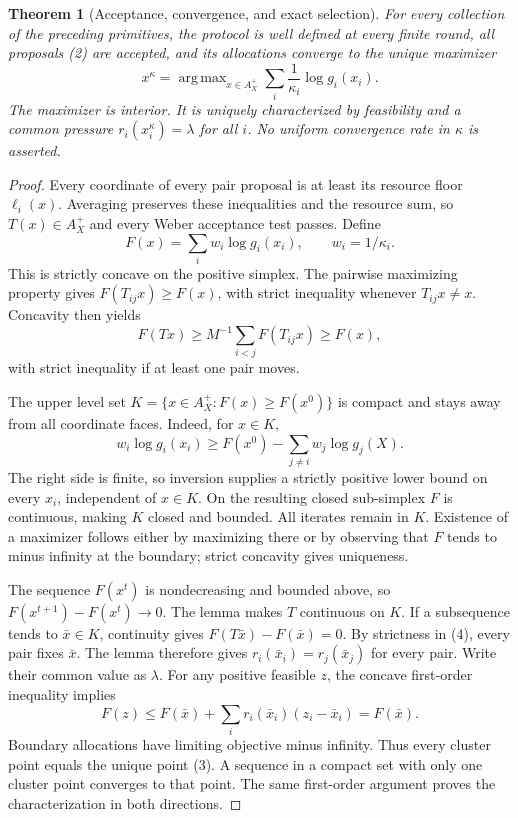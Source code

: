 \documentclass[11pt]{article}
\newtheorem{theorem}{Theorem}
\theoremstyle{remark}\newtheorem{remark}[theorem]{Remark}
\DeclareMathOperator*{\argmax}{arg\,max}
\begin{document}
\begin{theorem}[Acceptance, convergence, and exact selection]
For every collection of the preceding primitives, the protocol is well defined at every finite round, all proposals (2) are accepted, and its allocations converge to the unique maximizer
\[
 x^\kappa=\argmax_{x\in A_X^+}\sum_i\frac1{\kappa_i}\log g_i(x_i).
 \tag{3}
\]
The maximizer is interior. It is uniquely characterized by feasibility and a common pressure $r_i(x_i^\kappa)=\lambda$ for all $i$. No uniform convergence rate in $\kappa$ is asserted.
\end{theorem}
\begin{proof}
Every coordinate of every pair proposal is at least its resource floor $\ell_i(x)$. Averaging preserves these inequalities and the resource sum, so $T(x)\in A_X^+$ and every Weber acceptance test passes. Define
\[
 F(x)=\sum_i w_i\log g_i(x_i),\qquad w_i=1/\kappa_i.
\]
This is strictly concave on the positive simplex. The pairwise maximizing property gives $F(T_{ij}x)\ge F(x)$, with strict inequality whenever $T_{ij}x\ne x$. Concavity then yields
\[
 F(Tx)\ge M^{-1}\sum_{i<j}F(T_{ij}x)\ge F(x),
 \tag{4}
\]
with strict inequality if at least one pair moves.

The upper level set $K=\{x\in A_X^+:F(x)\ge F(x^0)\}$ is compact and stays away from all coordinate faces. Indeed, for $x\in K$,
\[
 w_i\log g_i(x_i)\ge F(x^0)-\sum_{j\ne i}w_j\log g_j(X).
\]
The right side is finite, so inversion supplies a strictly positive lower bound on every $x_i$, independent of $x\in K$. On the resulting closed sub-simplex $F$ is continuous, making $K$ closed and bounded. All iterates remain in $K$. Existence of a maximizer follows either by maximizing there or by observing that $F$ tends to minus infinity at the boundary; strict concavity gives uniqueness.

The sequence $F(x^t)$ is nondecreasing and bounded above, so $F(x^{t+1})-F(x^t)\to0$. The lemma makes $T$ continuous on $K$. If a subsequence tends to $\bar x\in K$, continuity gives $F(T\bar x)-F(\bar x)=0$. By strictness in (4), every pair fixes $\bar x$. The lemma therefore gives $r_i(\bar x_i)=r_j(\bar x_j)$ for every pair. Write their common value as $\lambda$. For any positive feasible $z$, the concave first-order inequality implies
\[
 F(z)\le F(\bar x)+\sum_i r_i(\bar x_i)(z_i-\bar x_i)
 =F(\bar x).
\]
Boundary allocations have limiting objective minus infinity. Thus every cluster point equals the unique point (3). A sequence in a compact set with only one cluster point converges to that point. The same first-order argument proves the characterization in both directions.
\end{proof}
\end{document}
